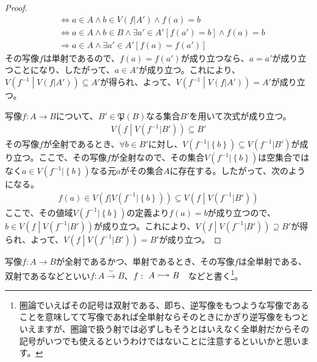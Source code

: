 \documentclass[dvipdfmx]{jsarticle}
\begin{document}
\begin{proof}
\begin{align*}
&\Leftrightarrow a \in A \land b \in V\left( f|A' \right) \land f(a) = b\\
&\Leftrightarrow a \in A \land b \in B \land \exists a' \in A'\left[ f\left( a' \right) = b \right] \land f(a) = b\\
&\Rightarrow a \in A \land \exists a' \in A'\left[ f(a) = f\left( a' \right) \right]
\end{align*}
その写像$f$は単射であるので、$f(a) = f\left( a' \right)$が成り立つなら、$a = a'$が成り立つことになり、したがって、$a \in A'$が成り立つ。これにより、$V\left( f^{- 1} \middle| V\left( f|A' \right) \right) \subseteq A'$が得られ、よって、$V\left( f^{- 1} \middle| V\left( f|A' \right) \right) = A'$が成り立つ。\par
写像$f:A \rightarrow B$について、$B'\in \mathfrak{P}(B)$なる集合$B'$を用いて次式が成り立つ。
\begin{align*}
V\left( f \middle| V\left( f^{- 1}|B' \right) \right) \subseteq B'
\end{align*}
その写像$f$が全射であるとき、$\forall b \in B'$に対し、$V\left( f^{- 1}|\left\{ b \right\} \right) \subseteq V\left( f^{- 1}|B' \right)$が成り立つ。ここで、その写像$f$が全射なので、その集合$V\left( f^{- 1}|\left\{ b \right\} \right)$は空集合ではなく$a \in V\left( f^{- 1}|\left\{ b \right\} \right)$なる元$a$がその集合$A$に存在する。したがって、次のようになる。
\begin{align*}
f(a) \in V\left( f|V\left( f^{- 1}|\left\{ b \right\} \right) \right) \subseteq V\left( f \middle| V\left( f^{- 1}|B' \right) \right)
\end{align*}
ここで、その値域$V\left( f^{- 1}|\left\{ b \right\} \right)$の定義より$f(a) = b$が成り立つので、$b \in V\left( f \middle| V\left( f^{- 1}|B' \right) \right)$が成り立つ。これにより、$V\left( f \middle| V\left( f^{- 1}|B' \right) \right) \supseteq B'$が得られ、よって、$V\left( f \middle| V\left( f^{- 1}|B' \right) \right) = B'$が成り立つ。
\end{proof}
\begin{dfn}
写像$f:A \rightarrow B$が全射であるかつ、単射であるとき、その写像$f$は全単射である、双射であるなどといい$f:A\overset{\sim}{\rightarrow}B$、$f:\text{\raisebox{-1mm}{\begin{tikzpicture}[auto]
  \node (a) at (0, 0) {$A$};
  \node (b) at (1, 0) {$B$};
  \draw [>->>] (a) to node {} (b);
  \end{tikzpicture} } } $などと書く\footnote{圏論でいえばその記号は双射である、即ち、逆写像をもつような写像であることを意味してて写像であれば全単射ならそのときにかぎり逆写像をもつといえますが、圏論で扱う射では必ずしもそうとはいえなく全単射だからその記号がいつでも使えるというわけではないことに注意するといいかと思います。}。
\end{dfn}
\end{document}
